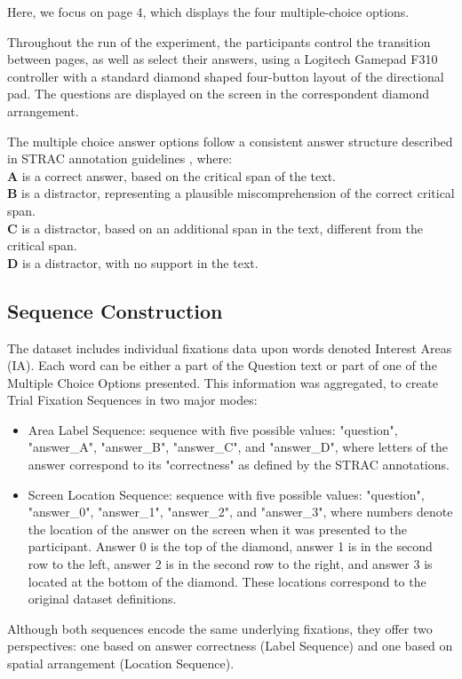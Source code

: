 \documentclass[manuscript,review,anonymous]{acmart}
\begin{document}
    Here, we focus on page 4, which displays the four multiple-choice options.
    
    Throughout the run of the experiment, the participants control the transition between pages, as well as select their answers, using a Logitech Gamepad F310 controller with a standard diamond shaped four-button layout of the directional pad. The questions are displayed on the screen in the correspondent diamond arrangement.  

    The multiple choice answer options follow a consistent answer structure described in STRAC annotation guidelines \cite{berzak2020starc}, where:\\
    \textbf{A} is a correct answer, based on the critical span of the text.\\
    \textbf{B} is a distractor, representing a plausible miscomprehension of the correct critical span. \\
    \textbf{C} is a distractor, based on an additional span in the text, different from the critical span. \\
    \textbf{D} is a distractor, with no support in the text.
    
    
    \subsection{Sequence Construction}
    The dataset includes individual fixations data upon words denoted Interest Areas (IA). Each word can be either a part of the Question text or part of one of the Multiple Choice Options presented. This information was aggregated, to create Trial Fixation Sequences in two major modes:
    \begin{itemize}
        \item Area Label Sequence: sequence with five possible values: "question", "answer\_A", "answer\_B", "answer\_C", and "answer\_D", where letters of the answer correspond to its "correctness" as defined by the STRAC annotations. 
        \item Screen Location Sequence: sequence with five possible values: "question", "answer\_0", "answer\_1", "answer\_2", and "answer\_3", where numbers denote the location of the answer on the screen when it was presented to the participant. Answer 0 is the top of the diamond, answer 1 is in the second row to the left, answer 2 is in the second row to the right, and answer 3 is located at the bottom of the diamond. These locations correspond to the original dataset definitions. 
    
    \end{itemize}
    Although both sequences encode the same underlying fixations, they offer two perspectives: one based on answer correctness (Label Sequence) and one based on spatial arrangement (Location Sequence). 
    
\end{document}
